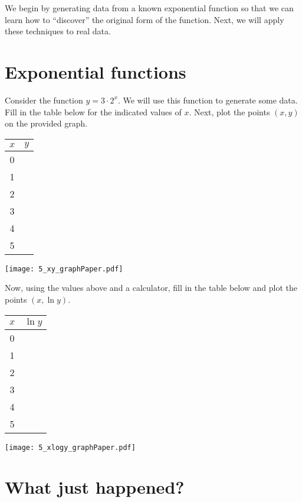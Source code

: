 
We begin by generating data from a known exponential function so that
we can learn how to ``discover'' the original form of the function.
Next, we will apply these techniques to real data.

\section{Exponential functions}

Consider the function $y = 3\cdot 2^x$.  We will use this function to
generate some data.  Fill in the table below for the indicated values
of $x$.  Next, plot the points $(x,y)$ on the provided graph.

\bigskip
\parbox[c][][c]{0.3\textwidth}{\centering
\begin{tabular}{cc}
  \toprule
  $x$ &$y$ \\ \midrule
  0 & \hspace{.4in}\phantom{.}\\ \midrule
  1 & \\ \midrule
  2 & \\ \midrule
  3 & \\ \midrule
  4 & \\ \midrule
  5 & \\ \bottomrule
\end{tabular}}
\hfill
\parbox[c][][c]{0.6\textwidth}{
\texttt{[image: 5\_xy\_graphPaper.pdf]}}
\bigskip

\noindent%
Now, using the values above and a calculator, fill in the table below
and plot the points $(x,\ln y)$.

\bigskip
\parbox[c][][c]{0.3\textwidth}{\centering
\begin{tabular}{cc}
  \toprule
  $x$ &$\ln y$ \\ \midrule
  0 & \hspace{.4in}\phantom{.}\\ \midrule
  1 & \\ \midrule
  2 & \\ \midrule
  3 & \\ \midrule
  4 & \\ \midrule
  5 & \\ \bottomrule
\end{tabular}}
\hfill
\parbox[c][][c]{0.6\textwidth}{
\texttt{[image: 5\_xlogy\_graphPaper.pdf]}}

\section{What just happened?}

